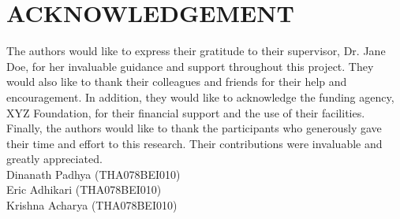 \newpage
{}
\section*{ACKNOWLEDGEMENT}

The authors would like to express their gratitude to their supervisor, Dr. Jane Doe, for her invaluable guidance and support throughout this project. They would also like to thank their colleagues and friends for their help and encouragement. In addition, they would like to acknowledge the funding agency, XYZ Foundation, for their financial support and the use of their facilities. Finally, the authors would like to thank the participants who generously gave their time and effort to this research. Their contributions were invaluable and greatly appreciated. \\

        Dinanath Padhya (THA078BEI010) \\
        Eric Adhikari (THA078BEI010) \\
        Krishna Acharya (THA078BEI010)
